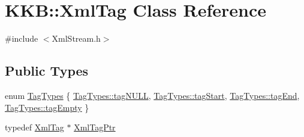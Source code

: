 \hypertarget{class_k_k_b_1_1_xml_tag}{}\section{K\+KB\+:\+:Xml\+Tag Class Reference}
\label{class_k_k_b_1_1_xml_tag}


{\ttfamily \#include $<$Xml\+Stream.\+h$>$}

\subsection*{Public Types}
\begin{DoxyCompactItemize}
\item 
enum \hyperlink{class_k_k_b_1_1_xml_tag_a6c0ef0e23f982f49d55d4fb7eaff6ac9}{Tag\+Types} \{ \hyperlink{class_k_k_b_1_1_xml_tag_a6c0ef0e23f982f49d55d4fb7eaff6ac9a91848844d7ea93a35d21cfd3b5f4bea2}{Tag\+Types\+::tag\+N\+U\+LL}, 
\hyperlink{class_k_k_b_1_1_xml_tag_a6c0ef0e23f982f49d55d4fb7eaff6ac9ab02b23b5e15b3a1353771313e1176ce0}{Tag\+Types\+::tag\+Start}, 
\hyperlink{class_k_k_b_1_1_xml_tag_a6c0ef0e23f982f49d55d4fb7eaff6ac9a3ceaa9a790f688ec97a35b5a3fd3b164}{Tag\+Types\+::tag\+End}, 
\hyperlink{class_k_k_b_1_1_xml_tag_a6c0ef0e23f982f49d55d4fb7eaff6ac9ac842083d30a90700e09f4cbf728f01b8}{Tag\+Types\+::tag\+Empty}
 \}
\item 
typedef \hyperlink{class_k_k_b_1_1_xml_tag}{Xml\+Tag} $\ast$ \hyperlink{class_k_k_b_1_1_xml_tag_a7f2c41a39e872901afd7edf641f8271b}{Xml\+Tag\+Ptr}
\end{DoxyCompactItemize}
